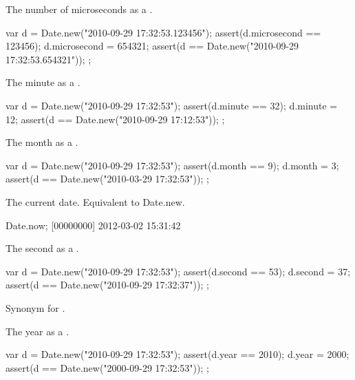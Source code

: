 \begin{urbiscriptapi}
\item[microsecond]
  The number of microseconds as a .
\begin{urbiscript}
{
  var d = Date.new("2010-09-29 17:32:53.123456");
  assert(d.microsecond == 123456);
  d.microsecond = 654321;
  assert(d == Date.new("2010-09-29 17:32:53.654321"));
};
\end{urbiscript}

\item[minute]
  The minute as a .
\begin{urbiscript}
{
  var d = Date.new("2010-09-29 17:32:53");
  assert(d.minute == 32);
  d.minute = 12;
  assert(d == Date.new("2010-09-29 17:12:53"));
};
\end{urbiscript}

\item[month]
  The month as a .
\begin{urbiscript}
{
  var d = Date.new("2010-09-29 17:32:53");
  assert(d.month == 9);
  d.month = 3;
  assert(d == Date.new("2010-03-29 17:32:53"));
};
\end{urbiscript}

\item[now] The current date. Equivalent to Date.new.
\begin{urbiunchecked}
Date.now;
[00000000] 2012-03-02 15:31:42
\end{urbiunchecked}

\item[second]
  The second as a .
\begin{urbiscript}
{
  var d = Date.new("2010-09-29 17:32:53");
  assert(d.second == 53);
  d.second = 37;
  assert(d == Date.new("2010-09-29 17:32:37"));
};
\end{urbiscript}

\item[timestamp] Synonym for .

\item[year]
  The year as a .
\begin{urbiscript}
{
  var d = Date.new("2010-09-29 17:32:53");
  assert(d.year == 2010);
  d.year = 2000;
  assert(d == Date.new("2000-09-29 17:32:53"));
};
\end{urbiscript}

\end{urbiscriptapi}



